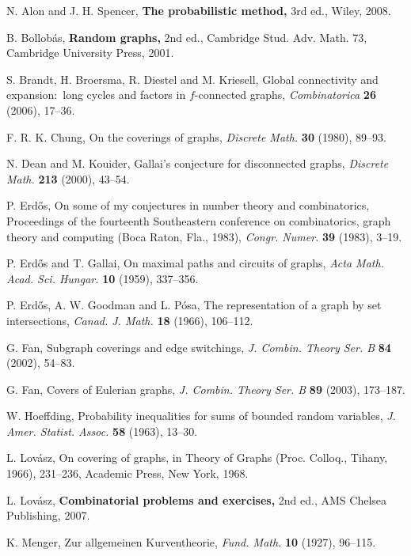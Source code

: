 \documentclass[11pt]{article}
\begin{document}
\begin{thebibliography}{}

{N. Alon and J. H. Spencer,} {\bf The probabilistic method,} 3rd ed., Wiley, 2008.

B. Bollob\'as, {\bf Random graphs,} 2nd ed., Cambridge Stud. Adv. Math. 73, Cambridge University Press, 2001.

S. Brandt, H. Broersma, R. Diestel and M. Kriesell, Global connectivity
and expansion:~long cycles and factors in $f$-connected graphs, {\it Combinatorica} {\bf 26} (2006),
17--36.

{F. R. K. Chung,} {On the coverings of graphs,} {\it Discrete Math.} {\bf 30} (1980), 89--93.

{N. Dean and M. Kouider,} {Gallai's conjecture for disconnected graphs,} {\it Discrete Math.} {\bf 213} (2000), 43--54.

{P. Erd\H{o}s,} {On some of my conjectures in number theory and combinatorics,}
{Proceedings of the fourteenth Southeastern conference on combinatorics, graph theory and computing (Boca Raton, Fla., 1983),}
{\it Congr. Numer.} {\bf 39} (1983), 3--19.

{P. Erd\H{o}s and T. Gallai,} {On maximal paths and circuits of graphs,} {\it Acta Math. Acad. Sci. Hungar.} {\bf 10} (1959), 337--356.

{P. Erd\H{o}s, A. W. Goodman and L. P\'osa,} {The representation of a graph by set intersections,} {\it Canad. J. Math.} {\bf 18} (1966), 106--112.

{G. Fan,} {Subgraph coverings and edge switchings,}  {\it J. Combin. Theory Ser. B} {\bf 84} (2002), 54--83.

{G. Fan,} {Covers of Eulerian graphs,} {\it J. Combin. Theory Ser. B} {\bf 89} (2003), 173--187.

{W. Hoeffding,} {Probability inequalities for sums of bounded random variables,} {\it J. Amer. Statist. Assoc.} {\bf 58} (1963), 13--30.

{L. Lov\'asz,} {On covering of graphs,} in Theory of Graphs (Proc. Colloq., Tihany, 1966), 231--236, Academic Press, New York, 1968.

{L. Lov\'asz,} {\bf Combinatorial problems and exercises,} 2nd ed., AMS Chelsea Publishing, 2007.

{K. Menger,} {Zur allgemeinen Kurventheorie,} {\it Fund. Math.} {\bf 10} (1927), 96--115.


\end{thebibliography}
\end{document}
